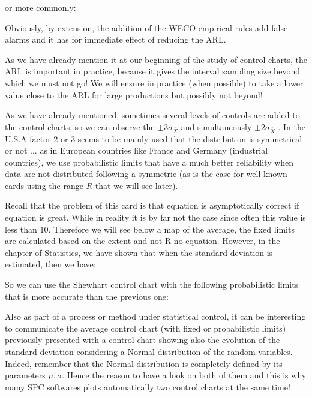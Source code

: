 	or more commonly:
	
	Obviously, by extension, the addition of the WECO empirical rules add false alarms and it has for immediate effect of reducing the ARL.
	
	As we have already mention it at our beginning of the study of control charts, the ARL is important in practice, because it gives the interval sampling size beyond which we must not go! We will ensure in practice (when possible) to take a lower value close to the ARL for large productions but possibly not beyond!
	
	\begin{tcolorbox}[title=Remark,colframe=black,arc=10pt]
	As we have already mentioned, sometimes several levels of controls are added to the control charts, so we can observe the $\pm 3\sigma_{\overline{X}}$ and simultaneously $\pm 2\sigma_{\overline{X}}$ . In the U.S.A factor $2$ or $3$ seems to be mainly used that the distribution is symmetrical or not ... as in European countries like France and Germany (industrial countries), we use probabilistic limits that have a much better reliability when data are not distributed following a symmetric (as is the case for well known cards using the range $R$ that we will see later).
	\end{tcolorbox}
	Recall that the problem of this card is that equation is asymptotically correct if equation is great. While in reality it is by far not the case since often this value is less than 10. Therefore we will see below a map of the average, the fixed limits are calculated based on the extent and not R no equation. However, in the chapter of Statistics, we have shown that when the standard deviation is estimated, then we have:
	
	So we can use the Shewhart control chart with the following probabilistic limits that is more accurate than the previous one:
	
	Also as part of a process or method under statistical control, it can be interesting to communicate the average control chart (with fixed or probabilistic limits) previously presented with a control chart showing also the evolution of the standard deviation considering a Normal distribution of the random variables. Indeed, remember that the Normal distribution is completely defined by its parameters $\mu,\sigma$. Hence the reason to have a look on both of them and this is why many SPC softwares plots automatically two control charts at the same time!
	
	
